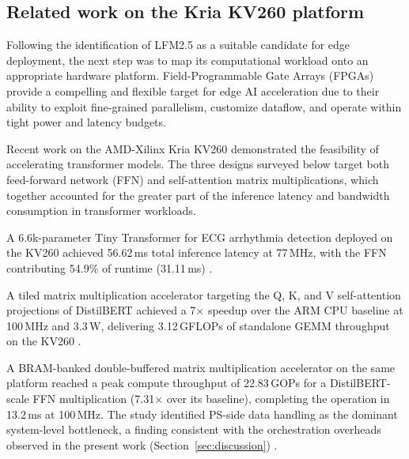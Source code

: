 \documentclass[manuscript,]{acmart} %
\begin{document}
\subsection{Related work on the Kria KV260 platform}
Following the identification of LFM2.5 as a suitable candidate for edge deployment, the next step was to map its computational workload onto an appropriate hardware platform. Field-Programmable Gate Arrays (FPGAs) provide a compelling and flexible target for edge AI acceleration due to their ability to exploit fine-grained parallelism, customize dataflow, and operate within tight power and latency budgets.

Recent work on the AMD-Xilinx Kria KV260 demonstrated the feasibility of
accelerating transformer models. The three designs surveyed below target
both feed-forward network (FFN) and self-attention matrix multiplications,
which together accounted for the greater part of the inference latency and bandwidth consumption in transformer workloads.

A 6.6k-parameter Tiny Transformer for ECG arrhythmia detection deployed on the
KV260 achieved 56.62\,ms total inference latency at 77\,MHz, with the FFN
contributing 54.9\% of runtime (31.11\,ms) \cite{11310944tin}.

A tiled matrix multiplication accelerator targeting the Q, K, and V
self-attention projections of DistilBERT achieved a 7$\times$ speedup over the
ARM CPU baseline at 100\,MHz and 3.3\,W, delivering 3.12\,GFLOPs of standalone
GEMM throughput on the KV260 \cite{li2025fpgabasedhardware}.

A BRAM-banked double-buffered matrix multiplication accelerator on the same
platform reached a peak compute throughput of 22.83\,GOPs for a
DistilBERT-scale FFN multiplication (7.31$\times$ over its baseline),
completing the operation in 13.2\,ms at 100\,MHz. The study identified
PS-side data handling as the dominant system-level bottleneck, a finding
consistent with the orchestration overheads observed in the present work
(Section~\ref{sec:discussion}) \cite{11311069}.
\end{document}
